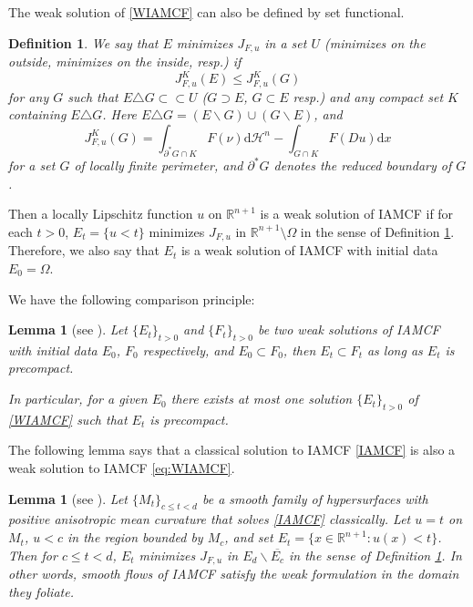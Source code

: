 \documentclass[10pt,a4paper]{amsart}
\newtheorem{lemma}[proposition]{Lemma}
\newtheorem{definition}[proposition]{Definition}
\numberwithin{equation}{section}
\begin{document}
The weak solution of \eqref{WIAMCF} can also be defined by set functional.
\begin{definition}
\label{def-minimizes}
    We say that $E$ minimizes $J_{F,u}$ in a set $U$ (minimizes on the outside, minimizes on the inside, resp.) if
    \begin{equation*}
        J_{F,u}^K(E) \leq J_{F,u}^K(G)
    \end{equation*}
    for any $G$ such that $E\triangle G\subset\subset U$  ($G\supset E$, $G\subset E$ resp.) and any compact set $K$ containing $E\triangle G$. Here $E\triangle G = (E\backslash G)\cup(G\backslash E)$, and 
    \begin{equation*}
        J_{F,u}^K(G) = \int_{\partial^* G \cap K} F(\nu)\mathrm{d}\mathcal{H}^{n} - \int_{G\cap K} F(Du) \mathrm{d}x
    \end{equation*}
    for a set $G$ of locally finite perimeter, and $\partial^*G$ denotes the reduced boundary of $G$.
\end{definition}

Then a locally Lipschitz function $u$ on $\mathbb{R}^{n+1}$ is a weak solution of IAMCF if for each $t>0$, $E_t=\{u<t\}$ minimizes $J_{F,u}$ in $\mathbb{R}^{n+1}\setminus\Omega$ in the sense of Definition \ref{def-minimizes}. Therefore, we also say that $E_t$ is a weak solution of IAMCF with initial data $E_0=\Omega$. 

We have the following comparison principle:
\begin{lemma}[see {\cite[Proposition 3.3]{DGX23}}]
    \label{lem-weakcom}
    Let $\{E_t\}_{t>0}$ and $\{F_t\}_{t>0}$ be two weak solutions of IAMCF with initial data $E_0$, $F_0$ respectively, and $E_0\subset F_0$, then $E_t\subset F_t$ as long as $E_t$ is precompact.
    
    In particular, for a given $E_0$ there exists at most one solution $\{E_t\}_{t>0}$ of \eqref{WIAMCF} such that $E_t$ is precompact. 
\end{lemma}


The following lemma says that a classical solution to IAMCF \eqref{IAMCF} is also a weak solution to IAMCF \eqref{eq:WIAMCF}.
\begin{lemma}[see {\cite[Lemma 2.5]{GWZ26}}]
		\label{lem-smweak}
		Let $\{M_t\}_{c\leq t<d}$ be a smooth family of hypersurfaces with positive anisotropic mean curvature that solves \eqref{IAMCF} classically. Let $u=t$ on $M_t$, $u<c$ in the region bounded by $M_c$, and set $E_t=\{x\in\mathbb{R}^{n+1}:u(x)<t\}$. Then for $c\leq t<d$, $E_t$ minimizes $J_{F,u}$ in $E_d\backslash \overline{E_c}$ in the sense of Definition \ref{def-minimizes}. In other words, smooth flows of IAMCF satisfy the weak formulation in the domain they foliate.
	\end{lemma}
\end{document}

